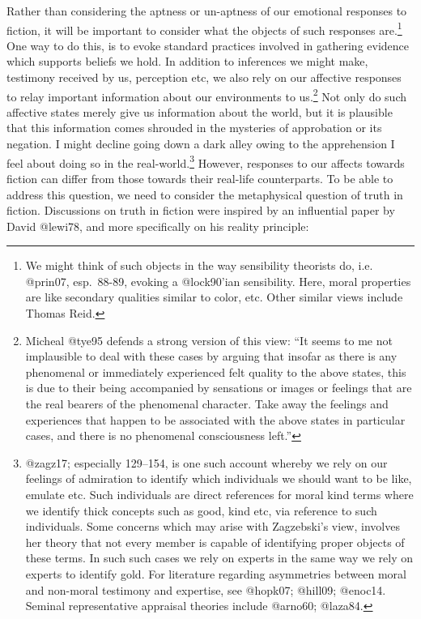 \documentclass[
  letterpaper,
  DIV=11,
  numbers=noendperiod]{scrartcl}
\theoremstyle{remark}
\begin{document}
Rather than considering the aptness or un-aptness of our emotional
responses to fiction, it will be important to consider what the objects
of such responses are.\footnote{We might think of such objects in the
  way sensibility theorists do, i.e. @prin07, esp.~88-89, evoking a
  @lock90'ian sensibility. Here, moral properties are like secondary
  qualities similar to color, etc. Other similar views include Thomas
  Reid.} One way to do this, is to evoke standard practices involved in
gathering evidence which supports beliefs we hold. In addition to
inferences we might make, testimony received by us, perception etc, we
also rely on our affective responses to relay important information
about our environments to us.\footnote{Micheal @tye95 defends a strong
  version of this view: ``It seems to me not implausible to deal with
  these cases by arguing that insofar as there is any phenomenal or
  immediately experienced felt quality to the above states, this is due
  to their being accompanied by sensations or images or feelings that
  are the real bearers of the phenomenal character. Take away the
  feelings and experiences that happen to be associated with the above
  states in particular cases, and there is no phenomenal consciousness
  left.''} Not only do such affective states merely give us information
about the world, but it is plausible that this information comes
shrouded in the mysteries of approbation or its negation. I might
decline going down a dark alley owing to the apprehension I feel about
doing so in the real-world.\footnote{@zagz17; especially 129--154, is
  one such account whereby we rely on our feelings of admiration to
  identify which individuals we should want to be like, emulate etc.
  Such individuals are direct references for moral kind terms where we
  identify thick concepts such as good, kind etc, via reference to such
  individuals. Some concerns which may arise with Zagzebski's view,
  involves her theory that not every member is capable of identifying
  proper objects of these terms. In such such cases we rely on experts
  in the same way we rely on experts to identify gold. For literature
  regarding asymmetries between moral and non-moral testimony and
  expertise, see @hopk07; @hill09; @enoc14. Seminal representative
  appraisal theories include @arno60; @laza84.} However, responses to
our affects towards fiction can differ from those towards their
real-life counterparts. To be able to address this question, we need to
consider the metaphysical question of truth in fiction. Discussions on
truth in fiction were inspired by an influential paper by David @lewi78,
and more specifically on his reality principle:
\end{document}
